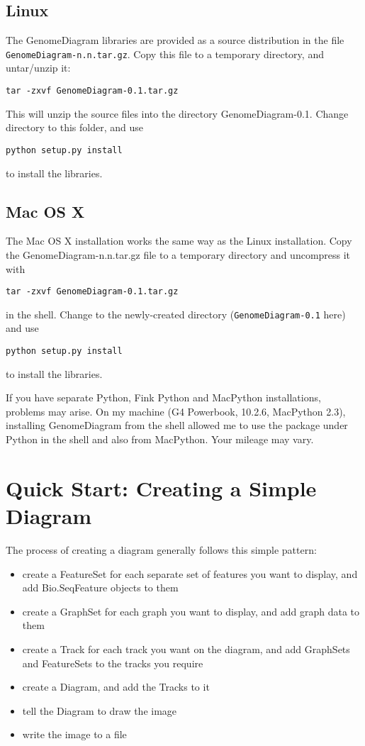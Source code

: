 \documentclass{article}
\begin{document}
\subsection{Linux}
The GenomeDiagram libraries are provided as a source distribution
in the file \texttt{GenomeDiagram-n.n.tar.gz}. Copy this file to a 
temporary directory, and untar/unzip it:

\texttt{tar -zxvf GenomeDiagram-0.1.tar.gz}

This will unzip the source files into the directory
GenomeDiagram-0.1. Change directory to this folder, and use

\texttt{python setup.py install}

to install the libraries.

\subsection{Mac OS X}
The Mac OS X installation works the same way as the Linux
installation.  Copy the GenomeDiagram-n.n.tar.gz file to a
temporary directory and uncompress it with

\texttt{tar -zxvf GenomeDiagram-0.1.tar.gz}

in the shell.  Change to the newly-created directory
(\texttt{GenomeDiagram-0.1} here) and use

\texttt{python setup.py install}

to install the libraries.

If you have separate Python, Fink Python and MacPython
installations, problems may arise.  On my machine (G4 Powerbook,
10.2.6, MacPython 2.3), installing GenomeDiagram from the shell
allowed me to use the package under Python in the shell and also
from MacPython. Your mileage may vary.

\section{Quick Start: Creating a Simple Diagram}\label{quickstart}
The process of creating a diagram generally follows this simple pattern:
\begin{itemize}
    \item create a FeatureSet for each separate set of features you 
want to display, and add Bio.SeqFeature objects to them
    \item create a GraphSet for each graph you want to display, and 
add graph data to them
    \item create a Track for each track you want on the diagram, and 
add GraphSets and FeatureSets to the tracks you require
    \item create a Diagram, and add the Tracks to it
    \item tell the Diagram to draw the image
    \item write the image to a file
\end{itemize}
\end{document}
